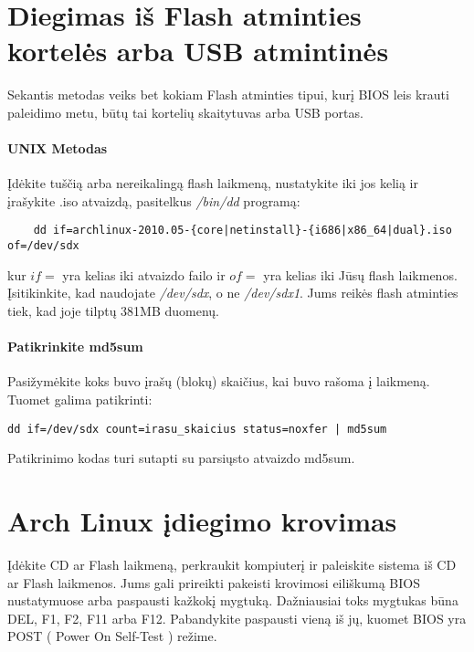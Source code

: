 \documentclass[a4paper]{book}
\begin{document}
  \section{Diegimas iš Flash atminties kortelės arba USB atmintinės}

  Sekantis metodas veiks bet kokiam Flash atminties tipui, kurį BIOS
  leis krauti paleidimo metu, būtų tai kortelių skaitytuvas arba USB
  portas.

  \paragraph{UNIX Metodas}
  
  Įdėkite tuščią arba nereikalingą flash laikmeną, nustatykite iki jos
  kelią ir įrašykite .iso atvaizdą, pasitelkus \textsl{/bin/dd}
  programą:

  \begin{verbatim}
    dd if=archlinux-2010.05-{core|netinstall}-{i686|x86_64|dual}.iso of=/dev/sdx
  \end{verbatim}

  kur $if=$ yra kelias iki atvaizdo failo ir $of=$ yra kelias iki Jūsų
  flash laikmenos. Įsitikinkite, kad naudojate \textsl{/dev/sdx}, o ne
  \textsl{/dev/sdx1}. Jums reikės flash atminties tiek, kad joje
  tilptų 381MB duomenų.

  \paragraph{Patikrinkite md5sum}

  Pasižymėkite koks buvo įrašų (blokų) skaičius, kai buvo rašoma į
  laikmeną. Tuomet galima patikrinti:

  \begin{verbatim}
dd if=/dev/sdx count=irasu_skaicius status=noxfer | md5sum
  \end{verbatim}

  Patikrinimo kodas turi sutapti su parsiųsto atvaizdo md5sum.


  \section{Arch Linux įdiegimo krovimas}
  
  Įdėkite CD ar Flash laikmeną, perkraukit kompiuterį ir paleiskite
  sistema iš CD ar Flash laikmenos. Jums gali prireikti pakeisti
  krovimosi eiliškumą BIOS nustatymuose arba paspausti kažkokį
  mygtuką. Dažniausiai toks mygtukas būna DEL, F1, F2, F11 arba
  F12. Pabandykite paspausti vieną iš jų, kuomet BIOS yra POST ( Power
  On Self-Test ) režime.
\end{document}
